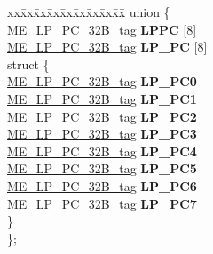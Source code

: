 \begin{DoxyCompactItemize}
\begin{tabbing}
\end{tabbing}\item 
\mbox{\label{structME__struct__tag_ab78fc211ab3e1b1d9751e48c68f1be72}} 
\begin{tabbing}
xx\=xx\=xx\=xx\=xx\=xx\=xx\=xx\=xx\=\kill
union \{\\
\>\mbox{\hyperlink{unionME__LP__PC__32B__tag}{ME\_LP\_PC\_32B\_tag}} {\bfseries LPPC} \mbox{[}8\mbox{]}\\
\>\mbox{\hyperlink{unionME__LP__PC__32B__tag}{ME\_LP\_PC\_32B\_tag}} {\bfseries LP\_PC} \mbox{[}8\mbox{]}\\
\mbox{\label{unionME__struct__tag_1_1_0D1639_a113da47d0974d721ff7e8d5dc2e132d5}} 
\>struct \{\\
\>\>\mbox{\hyperlink{unionME__LP__PC__32B__tag}{ME\_LP\_PC\_32B\_tag}} {\bfseries LP\_PC0}\\
\>\>\mbox{\hyperlink{unionME__LP__PC__32B__tag}{ME\_LP\_PC\_32B\_tag}} {\bfseries LP\_PC1}\\
\>\>\mbox{\hyperlink{unionME__LP__PC__32B__tag}{ME\_LP\_PC\_32B\_tag}} {\bfseries LP\_PC2}\\
\>\>\mbox{\hyperlink{unionME__LP__PC__32B__tag}{ME\_LP\_PC\_32B\_tag}} {\bfseries LP\_PC3}\\
\>\>\mbox{\hyperlink{unionME__LP__PC__32B__tag}{ME\_LP\_PC\_32B\_tag}} {\bfseries LP\_PC4}\\
\>\>\mbox{\hyperlink{unionME__LP__PC__32B__tag}{ME\_LP\_PC\_32B\_tag}} {\bfseries LP\_PC5}\\
\>\>\mbox{\hyperlink{unionME__LP__PC__32B__tag}{ME\_LP\_PC\_32B\_tag}} {\bfseries LP\_PC6}\\
\>\>\mbox{\hyperlink{unionME__LP__PC__32B__tag}{ME\_LP\_PC\_32B\_tag}} {\bfseries LP\_PC7}\\
\>\} \\
\}; \\


\end{tabbing}
\end{DoxyCompactItemize}
